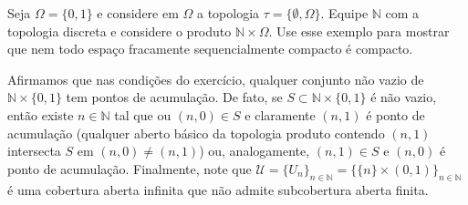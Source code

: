 \begin{Mybox}
Seja $\Omega = \{0, 1 \}$ e considere em $\Omega$ a topologia $\tau = \{\emptyset, \Omega \}$. Equipe $\mathbb{N}$ com a topologia discreta e considere o produto $\mathbb{N} \times \Omega$. Use esse exemplo para mostrar que nem todo espaço fracamente sequencialmente compacto é compacto.
\vspace{-.4cm}
\end{Mybox}
\vspace{-.5cm}
\begin{dem}
Afirmamos que nas condições do exercício, qualquer conjunto não vazio de $\mathbb{N} \times \{0, 1\}$ tem pontos de acumulação. De fato, se $S \subset \mathbb{N} \times \{0, 1\}$ é não vazio, então existe $n \in \mathbb{N}$ tal que ou $(n, 0) \in S$ e claramente $(n, 1)$ é ponto de acumulação (qualquer aberto básico da topologia produto contendo $(n, 1)$ intersecta $S$ em $(n, 0) \neq (n,1)$) ou, analogamente, $(n, 1) \in S$ e $(n, 0)$ é ponto de acumulação. Finalmente, note que $\mathscr{U} = \{U_n\}_{n \in \mathbb{N}} = \{\{n \} \times (0,1) \}_{n \in \mathbb{N}}$ é uma cobertura aberta infinita que não admite subcobertura aberta finita.
\end{dem}


